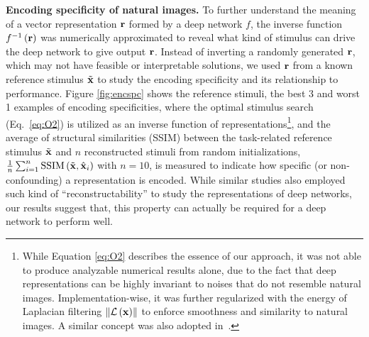 \documentclass[10pt,twocolumn,letterpaper]{article}
\begin{document}

\newcommand{\expregular}{While Equation \ref{eq:O2} describes the essence of our approach, it was not able to produce analyzable numerical results alone, due to the fact that deep representations can be highly invariant to noises that do not resemble natural images.
Implementation-wise, it was further regularized with the energy of Laplacian filtering $\left\| \mathcal{L} \left( \bf{x} \right) \right\|$ to enforce smoothness and similarity to natural images.
A similar concept was also adopted in~\cite{mahendran2014understanding}.
}  %

{\bf Encoding specificity of natural images.} To further understand the meaning of a vector representation $\bf{r}$ formed by a deep network $f$, the inverse function $f^{-1}\left( \bf{r} \right)$ {was} numerically approximated to reveal what kind of stimulus can drive the deep network to give output $\bf{r}$. 
Instead of inverting a randomly generated $\bf{r}$, which may not have feasible or interpretable solutions, we {used} $\bf{r}$ from a known reference stimulus $\tilde{\bf{x}}$ to study the encoding specificity and its relationship to performance.
Figure \ref{fig:encspc} shows the reference stimuli, the best 3 and worst 1 examples of encoding specificities, where the optimal stimulus search (Eq.~\ref{eq:O2}) is utilized as an inverse function of representations\footnote{\expregular}, and the average of structural similarities (SSIM) \cite{wang2004image} between the task-related reference stimulus $\tilde{\bf{x}}$ and $n$ reconstructed stimuli from random initializations, \ie $\frac{1}{n}\sum_{i=1}^{n} \mathrm{SSIM}\left(\tilde{\bf{x}} , \hat{{\bf{x}}}_i \right)$ with $n=10$, is measured to indicate how specific (or non-confounding) a representation is encoded.
While similar studies \cite{mahendran2014understanding, long2014convnets, razavian2014persistent} also employed such kind of ``reconstructability'' to study the representations of deep networks, our results suggest that, this property can actually be required for a deep network to perform well.

\end{document}
